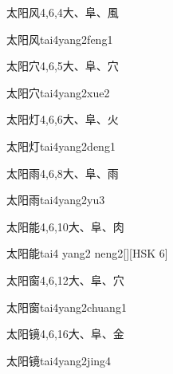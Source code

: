 \begin{entry}{太阳风}{4,6,4}{⼤、⾩、⾵}
  \begin{phonetics}{太阳风}{tai4yang2feng1}
  \end{phonetics}
\end{entry}

\begin{entry}{太阳穴}{4,6,5}{⼤、⾩、⽳}
  \begin{phonetics}{太阳穴}{tai4yang2xue2}
  \end{phonetics}
\end{entry}

\begin{entry}{太阳灯}{4,6,6}{⼤、⾩、⽕}
  \begin{phonetics}{太阳灯}{tai4yang2deng1}
  \end{phonetics}
\end{entry}

\begin{entry}{太阳雨}{4,6,8}{⼤、⾩、⾬}
  \begin{phonetics}{太阳雨}{tai4yang2yu3}
  \end{phonetics}
\end{entry}

\begin{entry}{太阳能}{4,6,10}{⼤、⾩、⾁}
  \begin{phonetics}{太阳能}{tai4 yang2 neng2}[][HSK 6]
  \end{phonetics}
\end{entry}

\begin{entry}{太阳窗}{4,6,12}{⼤、⾩、⽳}
  \begin{phonetics}{太阳窗}{tai4yang2chuang1}
  \end{phonetics}
\end{entry}

\begin{entry}{太阳镜}{4,6,16}{⼤、⾩、⾦}
  \begin{phonetics}{太阳镜}{tai4yang2jing4}
  \end{phonetics}
\end{entry}

